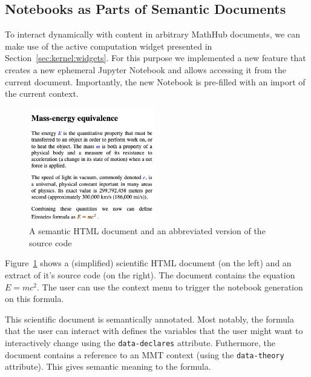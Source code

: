 \subsection{Notebooks as Parts of Semantic Documents}

To interact dynamically with content in arbitrary MathHub documents, we can make use of the active computation widget presented in Section~\ref{sec:kernel:widgets}. 
For this purpose we implemented a new feature that creates a new ephemeral Jupyter Notebook and allows accessing it from the current document. 
Importantly, the new Notebook is pre-filled with an import of the current context. 

\begin{figure}[h]
  \begin{minipage}[c]{5.5cm}
  \vspace{-20pt}
  \includegraphics[width=5.5cm]{screenshots/sciencedoc}
  \end{minipage}
  \begin{minipage}[c]{7cm}
    
  \end{minipage}
  \caption{A semantic HTML document and an abbreviated version of the source code}\label{fig:conversionHTML}
\end{figure}

Figure~\ref{fig:conversionHTML} shows a (simplified) scientific HTML document (on the left) and an extract of it's source code (on the right).
The document contains the equation $E=mc^2$. 
The user can use the context menu to trigger the notebook generation on this formula.

This scientific document is semantically annotated. 
Most notably, the formula that the user can interact with defines the variables that the user might want to interactively change using the \texttt{data-declares} attribute. 
Futhermore, the document contains a reference to an MMT context (using the \texttt{data-theory} attribute). 
This gives semantic meaning to the formula. 

